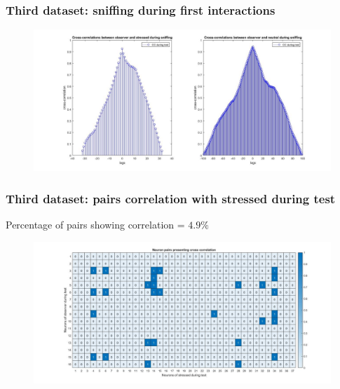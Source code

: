 \documentclass{beamer}
\begin{document}
\begin{frame}
\frametitle{Third dataset: sniffing during first interactions}


\begin{figure}[H]
	\begin{center}
		\hspace*{-1cm}
		\includegraphics[scale=.28]{sniff3_reduced_times.jpg} 
	\end{center}  
	
	
\end{figure}

\end{frame}

\begin{frame}
\frametitle{Third dataset: pairs correlation with stressed during test}

Percentage of pairs showing correlation = $ 4.9\%$

\begin{figure}[H]
	\begin{center}
		\hspace*{-1cm}
		\includegraphics[scale=.28]{neuron_corr_stress_test3.jpg} 
	\end{center}  
	
	
\end{figure}

\end{frame}
\end{document}
